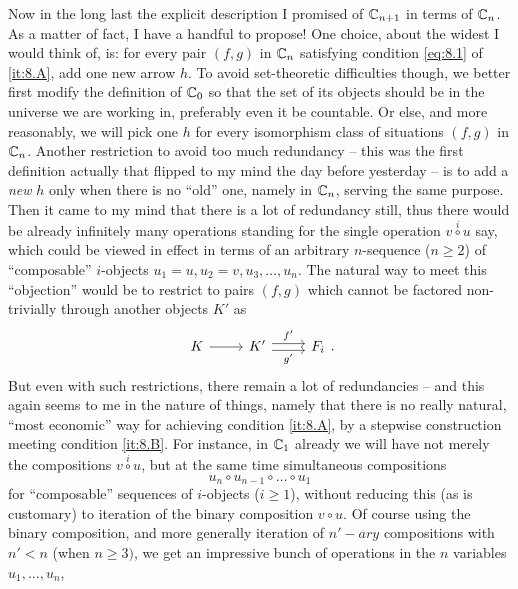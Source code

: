 \label{sec:10}%
Now in the long last the explicit description I promised of ${\mathbb{C}}_{n+1}$
in terms of ${\mathbb{C}}_n$. As a matter of fact, I have a handful
to propose! One choice, about the widest I would think of, is: for
every pair $(f,g)$ in ${\mathbb{C}}_n$ satisfying condition \eqref{eq:8.1}
of \ref{it:8.A}, add one new arrow $h$. To avoid set-theoretic
difficulties though, we better first modify the definition of ${\mathbb{C}}_0$
so that the set of its objects should be in the universe we are
working in, preferably even it be countable. Or else, and more
reasonably, we will pick one $h$ for every isomorphism class of
situations $(f,g)$ in ${\mathbb{C}}_n$. Another restriction to avoid too
much redundancy -- this was the first definition actually that flipped
to my mind the day before yesterday -- is to add a \emph{new} $h$ only
when there is no ``old'' one, namely in ${\mathbb{C}}_n$, serving the same
purpose. Then it came to my mind that there is a lot of redundancy
still, thus there would be already infinitely many
operations standing for the single operation $v \overset{i}{\circ} u$
say, which could be viewed in effect in terms of an arbitrary
$n$-sequence ($n\ge2$) of ``composable'' $i$-objects $u_1=u, u_2=v,
u_3, \dots, u_n$. The natural way to meet this ``objection'' would be
to restrict to pairs $(f,g)$ which cannot be factored non-trivially
through another objects $K'$ as
\[\begin{tikzcd}
  K \ar[r] & K' \ar[r, shift left, "f'"] \ar[r, shift right, swap,
  "g'"] & F_i \end{tikzcd}.\]
But even with such restrictions, there remain a lot of redundancies --
and this again seems to me in the nature of things, namely that there
is no really natural, ``most economic'' way for achieving condition
\ref{it:8.A}, by a stepwise construction meeting condition
\ref{it:8.B}. For instance, in ${\mathbb{C}}_1$ already we will have not
merely the compositions $v \overset{i}{\circ} u$, but at the same time
simultaneous compositions
\begin{equation}
  \label{eq:10.star}
  u_n \circ u_{n-1} \circ \dots \circ u_1 \tag{*}
\end{equation}
for ``composable'' sequences of $i$-objects ($i\ge1$), without
reducing this (as is customary) to iteration of the binary composition
$v \circ u$.
Of course using the binary composition, and more generally iteration
of $n'-ary$ compositions with $n'<n$ (when $n\ge3)$, we get an
impressive bunch of operations in the $n$ variables $u_1, \dots, u_n$,
